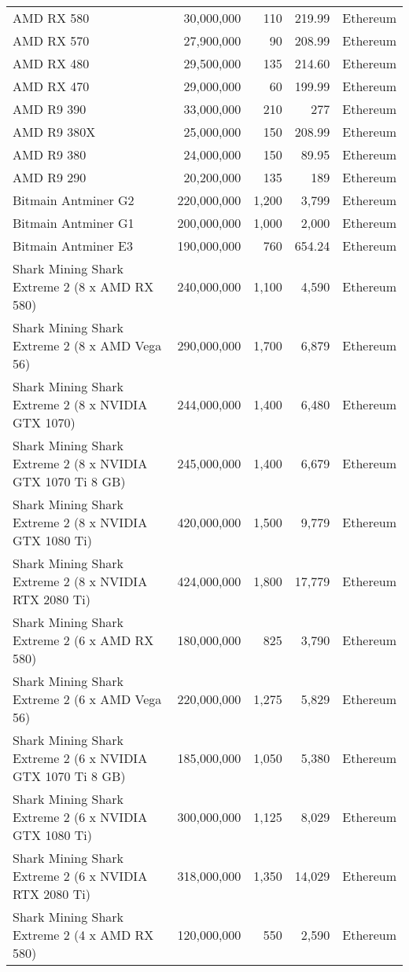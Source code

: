 \begin{longtable}{|p{}|r|r|r|p{}|}
  AMD RX 580 & 30,000,000 & 110 & 219.99 & Ethereum \\
  AMD RX 570 & 27,900,000 & 90 & 208.99 & Ethereum \\
  AMD RX 480 & 29,500,000 & 135 & 214.60 & Ethereum \\
  AMD RX 470 & 29,000,000 & 60 & 199.99 & Ethereum \\
  AMD R9 390 & 33,000,000 & 210 & 277 & Ethereum \\
  AMD R9 380X & 25,000,000 & 150 & 208.99 & Ethereum \\
  AMD R9 380 & 24,000,000 & 150 & 89.95 & Ethereum \\
  AMD R9 290 & 20,200,000 & 135 & 189 & Ethereum \\
  Bitmain Antminer G2 & 220,000,000 & 1,200 & 3,799 & Ethereum \\
  Bitmain Antminer G1 & 200,000,000 & 1,000 & 2,000 & Ethereum \\
  Bitmain Antminer E3 & 190,000,000 & 760 & 654.24 & Ethereum \\
  Shark Mining Shark Extreme 2 (8 x AMD RX 580) & 240,000,000 & 1,100 & 4,590 & Ethereum \\
  Shark Mining Shark Extreme 2 (8 x AMD Vega 56) & 290,000,000 & 1,700 & 6,879 & Ethereum \\
  Shark Mining Shark Extreme 2 (8 x NVIDIA GTX 1070) & 244,000,000 & 1,400 & 6,480 & Ethereum \\
  Shark Mining Shark Extreme 2 (8 x NVIDIA GTX 1070 Ti 8 GB) & 245,000,000 & 1,400 & 6,679 & Ethereum \\
  Shark Mining Shark Extreme 2 (8 x NVIDIA GTX 1080 Ti) & 420,000,000 & 1,500 & 9,779 & Ethereum \\
  Shark Mining Shark Extreme 2 (8 x NVIDIA RTX 2080 Ti) & 424,000,000 & 1,800 & 17,779 & Ethereum \\
  Shark Mining Shark Extreme 2 (6 x AMD RX 580) & 180,000,000 & 825 & 3,790 & Ethereum \\
  Shark Mining Shark Extreme 2 (6 x AMD Vega 56) & 220,000,000 & 1,275 & 5,829 & Ethereum \\
  Shark Mining Shark Extreme 2 (6 x NVIDIA GTX 1070 Ti 8 GB) & 185,000,000 & 1,050 & 5,380 & Ethereum \\
  Shark Mining Shark Extreme 2 (6 x NVIDIA GTX 1080 Ti) & 300,000,000 & 1,125 & 8,029 & Ethereum \\
  Shark Mining Shark Extreme 2 (6 x NVIDIA RTX 2080 Ti) & 318,000,000 & 1,350 & 14,029 & Ethereum \\
  Shark Mining Shark Extreme 2 (4 x AMD RX 580) & 120,000,000 & 550 & 2,590 & Ethereum \\

\end{longtable}

